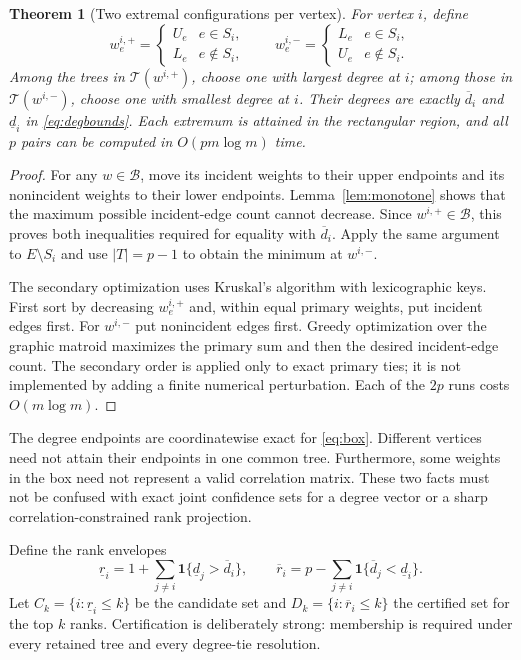 \documentclass[pdflatex,sn-mathphys-ay]{sn-jnl}
\theoremstyle{thmstyleone}
\newtheorem{theorem}{Theorem}
\theoremstyle{thmstyletwo}
\newcommand{\T}{\mathcal T}
\newcommand{\B}{\mathcal B}
\newcommand{\ind}{\mathbf 1}
\begin{document}
\begin{theorem}[Two extremal configurations per vertex]\label{thm:degree}
For vertex $i$, define
\begin{equation}\label{eq:scenarios}
 w^{i,+}_e=\begin{cases}U_e&e\in S_i,\\L_e&e\notin S_i,\end{cases}
 \qquad
 w^{i,-}_e=\begin{cases}L_e&e\in S_i,\\U_e&e\notin S_i.\end{cases}
\end{equation}
Among the trees in $\T(w^{i,+})$, choose one with largest degree at $i$; among those in $\T(w^{i,-})$, choose one with smallest degree at $i$. Their degrees are exactly $\overline d_i$ and $\underline d_i$ in \eqref{eq:degbounds}. Each extremum is attained in the rectangular region, and all $p$ pairs can be computed in $O(pm\log m)$ time.
\end{theorem}
\begin{proof}
For any $w\in\B$, move its incident weights to their upper endpoints and its nonincident weights to their lower endpoints. Lemma~\ref{lem:monotone} shows that the maximum possible incident-edge count cannot decrease. Since $w^{i,+}\in\B$, this proves both inequalities required for equality with $\overline d_i$. Apply the same argument to $E\setminus S_i$ and use $|T|=p-1$ to obtain the minimum at $w^{i,-}$.

The secondary optimization uses Kruskal's algorithm with lexicographic keys. First sort by decreasing $w^{i,+}_e$ and, within equal primary weights, put incident edges first. For $w^{i,-}$ put nonincident edges first. Greedy optimization over the graphic matroid maximizes the primary sum and then the desired incident-edge count. The secondary order is applied only to exact primary ties; it is not implemented by adding a finite numerical perturbation. Each of the $2p$ runs costs $O(m\log m)$.
\end{proof}

The degree endpoints are coordinatewise exact for \eqref{eq:box}. Different vertices need not attain their endpoints in one common tree. Furthermore, some weights in the box need not represent a valid correlation matrix. These two facts must not be confused with exact joint confidence sets for a degree vector or a sharp correlation-constrained rank projection.

Define the rank envelopes
\begin{equation}\label{eq:rankbounds}
 \underline r_i=1+\sum_{j\ne i}\ind\{\underline d_j>\overline d_i\},\qquad
 \overline r_i=p-\sum_{j\ne i}\ind\{\overline d_j<\underline d_i\}.
\end{equation}
Let $C_k=\{i:\underline r_i\le k\}$ be the candidate set and $D_k=\{i:\overline r_i\le k\}$ the certified set for the top $k$ ranks. Certification is deliberately strong: membership is required under every retained tree and every degree-tie resolution.
\end{document}
